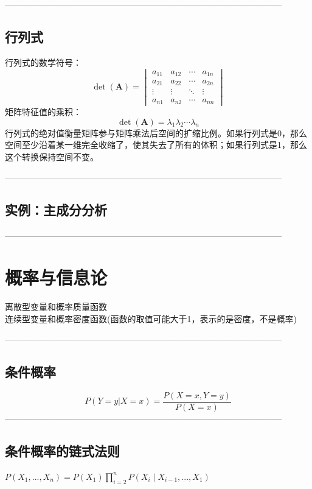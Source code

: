 \documentclass{article}
\begin{document}
--------------------------------------------------------------------------------------------------

\subsection{行列式}
行列式的数学符号：
$$
\det(\mathbf{A})=\begin{vmatrix}a_{11} & a_{12} & \cdots & a_{1n}\\a_{21} & a_{22} & \cdots & a_{2n}\\\vdots & \vdots & \ddots & \vdots\\a_{n1} & a_{n2} & \cdots & a_{nn}\end{vmatrix}
$$
矩阵特征值的乘积：
$$
\det(\mathbf{A})=\lambda_1 \lambda_2 \cdots \lambda_n
$$
行列式的绝对值衡量矩阵参与矩阵乘法后空间的扩缩比例。如果行列式是0，那么空间至少沿着某一维完全收缩了，使其失去了所有的体积；如果行列式是1，那么这个转换保持空间不变。

--------------------------------------------------------------------------------------------------

\subsection{实例：主成分分析}

--------------------------------------------------------------------------------------------------

\section{概率与信息论}

离散型变量和概率质量函数 \\
连续型变量和概率密度函数(函数的取值可能大于1，表示的是密度，不是概率)

--------------------------------------------------------------------------------------------------
\subsection{条件概率}
\begin{equation}
    P(Y=y|X=x) = \frac{P(X=x,Y=y)}{P(X=x)}
    \end{equation}
--------------------------------------------------------------------------------------------------
\subsection{条件概率的链式法则}
$P(X_1, ..., X_n) = P(X_1) \prod_{i=2}^n P(X_i \mid X_{i-1},...,X_1)$
\end{document}
